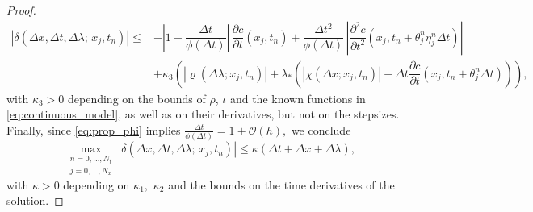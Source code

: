 \documentclass[a4paper, UKenglish, numberwithinsect, thm-restate]{tgdk-v2021}
\begin{document}
\begin{proof}
\begin{equation*}
\begin{split}
            |\delta(\Delta x, \Delta t, \Delta \lambda; \,  x_j,t_n)|\leq & -\left|1-\dfrac{\Delta t}{\phi(\Delta t)}\right| \, \dfrac{\partial c}{\partial t}(x_j,t_n)+\dfrac{\Delta t^2}{\phi(\Delta t)} \, \left|\dfrac{\partial^2 c}{\partial t^2}(x_j,t_{n}+\theta_j^n\eta_j^n\Delta t)\right| \\
            & +\kappa_3 \left( \left| \varrho(\Delta \lambda; x_j, t_n) \right| +  \lambda_{*}  \left( \left|\chi(\Delta x; x_j, t_n) \right| - \Delta t \dfrac{\partial c}{\partial t}(x_j,t_{n}+\theta_j^n\Delta t) \right)  \right),
        \end{split}
    \end{equation*}
with $\kappa_3>0$ depending on the bounds of $\rho$, $\iota$ and the known functions in \eqref{eq:continuous_model}, as well as on their derivatives, but not on the stepsizes. Finally, since  \eqref{eq:prop_phi} implies $\frac{\Delta t}{\phi(\Delta t)}=1+\mathcal{O}(h),$ we conclude
\begin{equation*}
        \max_{\substack{n=0,\dots, N_t \\ j=0,\dots, N_x}}|\delta(\Delta x, \Delta t, \Delta \lambda; \,  x_j,t_n)| \leq \kappa (\Delta t+\Delta x + \Delta \lambda),
\end{equation*}
with $\kappa>0$ depending on $\kappa_1,$ $\kappa_2$ and the bounds on the time derivatives of the solution.
\end{proof}
\end{document}
